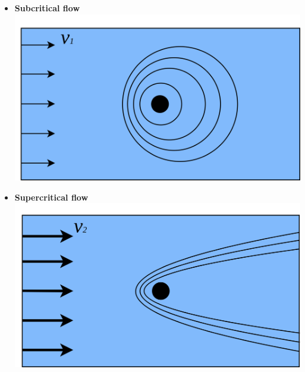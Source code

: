\begin{frame}
\begin{minipage}{0.45\textwidth}
\begin{itemize}
\vspace{1cm}
\item<1->[] 
\centering
{\LARGE \textbf{Subcritical flow}}\\[0.15cm]
\hspace{0.2cm}
\includegraphics[width=1\textwidth]{Resources/Images/subcritical.png}
\end{itemize}
\end{minipage}
\hspace{1cm}
\begin{minipage}{0.45\textwidth}
\centering
\begin{itemize}
\vspace{1cm}
\item<2->[] 
\centering
{\LARGE \textbf{Supercritical flow}}\\[0.15cm]
\hspace{0.25cm}
\includegraphics[width=1\textwidth]{Resources/Images/supercritical.png}
\end{itemize}
\end{minipage}
\end{frame}


